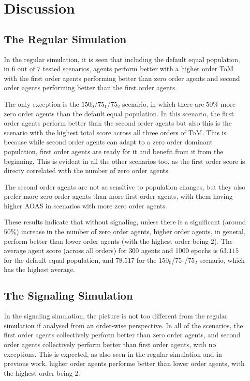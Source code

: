 \section{Discussion}\label{sec:discussion}

\subsection{The Regular Simulation}

In the regular simulation, it is seen that including the default equal population, in 6 out of 7 tested scenarios, agents perform better with a higher order ToM with the first order agents performing better than zero order agents and second order agents performing better than the first order agents. 

The only exception is the $150_{0}$/$75_{1}$/$75_{2}$ scenario, in which there are $50\%$ more zero order agents than the default equal population. In this scenario, the first order agents perform better than the second order agents but also this is the scenario with the highest total score across all three orders of ToM. This is because while second order agents can adapt to a zero order dominant population, first order agents are ready for it and benefit from it from the beginning. This is evident in all the other scenarios too, as the first order score is directy correlated with the number of zero order agents. 

The second order agents are not as sensitive to population changes, but they also prefer more zero order agents than more first order agents, with them having higher AOAS in scenarios with more zero order agents.

These results indicate that without signaling, unless there is a significant (around $50\%$) increase in the number of zero order agents, higher order agents, in general, perform better than lower order agents (with the highest order being 2). The average agent score (across all orders) for 300 agents and 1000 epochs is $\mathbf{63.115}$ for the default equal population, and $\mathbf{78.517}$ for the $150_{0}$/$75_{1}$/$75_{2}$ scenario, which has the highest average.

\subsection{The Signaling Simulation}

In the signaling simulation, the picture is not too different from the regular simulation if analysed from an order-wise perspective. In all of the scenarios, the first order agents collectively perform better than zero order agents, and second order agents collectively perform better than first order agents, with no exceptions. This is expected, as also seen in the regular simulation and in previous work, higher order agents performe better than lower order agents, with the highest order being 2.

